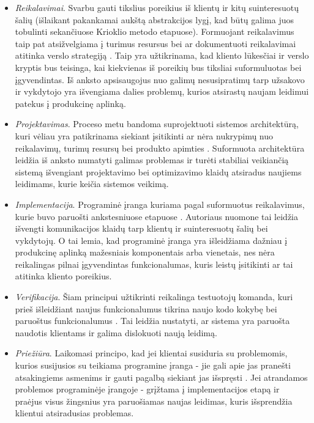 \documentclass{VUMIFPSkursinis}
\begin{document}
\begin{itemize}
  \item \textit{Reikalavimai}. Svarbu gauti tikslius poreikius iš klientų ir kitų suinteresuotų šalių (išlaikant pakankamai aukštą abstrakcijos lygį, kad būtų galima juos tobulinti sekančiuose Krioklio metodo etapuose). Formuojant reikalavimus taip pat atsižvelgiama į turimus resursus bei ar dokumentuoti reikalavimai atitinka verslo strategiją \cite{SaltKetvirtas}. Taip yra užtikrinama, kad kliento lūkesčiai ir verslo kryptis bus teisinga, kai kiekvienas iš poreikių bus tiksliai suformuluotas bei įgyvendintas. Iš anksto apsisaugojus nuo galimų nesusipratimų tarp užsakovo ir vykdytojo yra išvengiama dalies problemų, kurios atsirastų naujam leidimui patekus į produkcinę aplinką.

  \item \textit{Projektavimas}. Proceso metu bandoma suprojektuoti sistemos architektūrą, kuri vėliau yra patikrinama siekiant įsitikinti ar nėra nukrypimų nuo reikalavimų, turimų resursų bei produkto apimties \cite{SaltKetvirtas}. Suformuota architektūra leidžia iš anksto numatyti galimas problemas ir turėti stabiliai veikiančią sistemą išvengiant projektavimo bei optimizavimo klaidų atsiradus naujiems leidimams, kurie keičia sistemos veikimą. 
  
  \item \textit{Implementacija}. Programinė įranga kuriama pagal suformuotus reikalavimus, kurie buvo paruošti ankstesniuose etapuose \cite{SaltPenktas}.  Autoriaus nuomone tai leidžia išvengti komunikacijos klaidų tarp klientų ir suinteresuotų šalių bei vykdytojų. O tai lemia, kad programinė įranga yra išleidžiama dažniau į produkcinę aplinką mažesniais komponentais arba vienetais, nes nėra reikalingas pilnai įgyvendintas funkcionalumas, kuris leistų įsitikinti ar tai atitinka kliento poreikius.
  
  \item \textit{Verifikacija}. Šiam principui užtikrinti reikalinga testuotojų komanda, kuri prieš išleidžiant naujus funkcionalumus tikrina naujo kodo kokybę bei paruoštus funkcionalumus \cite{SaltKetvirtas}. Tai leidžia nustatyti, ar sistema yra paruošta naudotis klientams ir galima dislokuoti naują leidimą.
  
  \item \textit{Priežiūra}. Laikomasi principo, kad jei klientai susiduria su problemomis, kurios susijusios su teikiama programine įranga - jie gali apie jas pranešti atsakingiems asmenims ir gauti pagalbą siekiant jas išspręsti \cite{SaltKetvirtas}. Jei atrandamos problemos programinėje įrangoje - grįžtama į implementacijos etapą ir praėjus visus žingsnius yra paruošiamas naujas leidimas, kuris išsprendžia klientui atsiradusias problemas.
\end{itemize}
\end{document}
